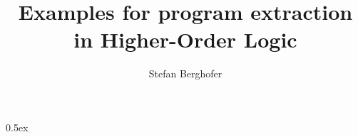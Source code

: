 \documentclass[11pt,a4paper]{article}
\begin{document}
\title{Examples for program extraction in Higher-Order Logic}
\author{Stefan Berghofer}
\maketitle

\nocite{Berger-JAR-2001,Coquand93}

\tableofcontents

\parindent 0pt\parskip 0.5ex





\end{document}
